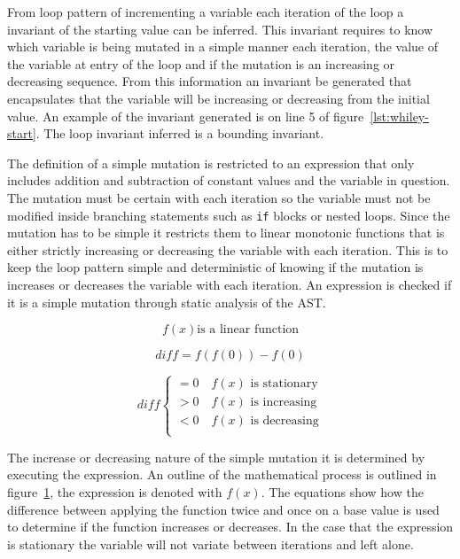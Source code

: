 \documentclass[11pt, a4paper, twoside, openright]{report}
\newcommand{\code}[1]{\texttt{#1}}
\begin{document}
From loop pattern of incrementing a variable each iteration of the loop
a invariant of the starting value can be inferred.
This invariant requires to know which variable is being
mutated in a simple manner each iteration,
the value of the variable at entry of the loop and if the mutation is an
increasing or decreasing sequence.
From this information an invariant be generated that encapsulates that the
variable will be increasing or decreasing from the initial value.
An example of the invariant generated is on line 5 of
figure~\ref{lst:whiley-start}.
The loop invariant inferred is a bounding invariant.

The definition of a simple mutation is restricted to an expression that only
includes addition and subtraction of constant values and the variable in question.
The mutation must be certain with each iteration so the variable must not be
modified inside branching statements such as \code{if} blocks or nested loops.
Since the mutation has to be simple it restricts them to linear monotonic
functions that is either strictly increasing or decreasing the variable with each iteration.
This is to keep the loop pattern simple and deterministic of knowing if the
mutation is increases or decreases the variable with each iteration.
An expression is checked if it is a simple mutation through static analysis of
the AST.

\begin{figure}
    $$f(x) \text{is a linear function}$$

    $$diff = f(f(0)) - f(0)$$

    \[
        diff \begin{cases}
            = 0 \quad f(x) \text{ is stationary}\\
            > 0 \quad f(x) \text{ is increasing}\\
            < 0 \quad f(x) \text{ is decreasing}\\
        \end{cases}
    \]
\label{math:simple-mutation}
\end{figure}

The increase or decreasing nature of the simple mutation it is determined by
executing the expression. An outline of the mathematical process is outlined
in figure~\ref{math:simple-mutation}, the expression is denoted with $f(x)$.
The equations show how the difference between applying the function twice and once on a base value is used to
determine if the function increases or decreases.
In the case that the expression is stationary the variable will not variate
between iterations and left alone.
\end{document}
